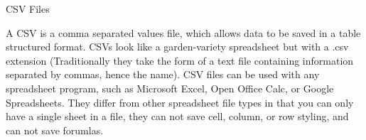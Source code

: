 CSV Files

A CSV is a comma separated values file, which allows data to be saved in a table structured format. CSVs look like a garden-variety spreadsheet but with a .csv extension (Traditionally they take the form of a text file containing information separated by commas, hence the name). CSV files can be used with any spreadsheet program, such as Microsoft Excel, Open Office Calc, or Google Spreadsheets. They differ from other spreadsheet file types in that you can only have a single sheet in a file, they can not save cell, column, or row styling, and can not save forumlas.
